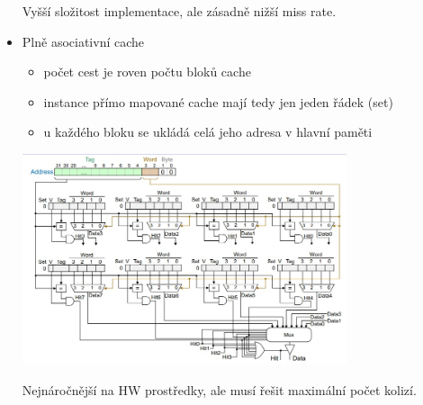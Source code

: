 \begin{itemize}
	Vyšší složitost implementace, ale zásadně nižší miss rate.
	
	\item Plně asociativní cache
	\begin{itemize}
		\item počet cest je roven počtu bloků cache
		\item instance přímo mapované cache mají tedy jen jeden řádek (set)
		\item u každého bloku se ukládá celá jeho adresa v hlavní paměti
	\end{itemize}
	
	\includegraphics[width=0.75\textwidth]{img/OB-5_2.jpg}
	
	Nejnáročnější na HW prostředky, ale musí řešit maximální počet kolizí.
	
	
\end{itemize}